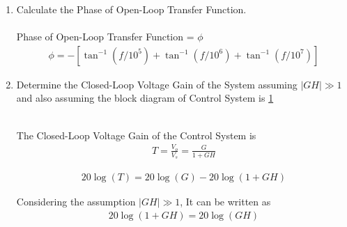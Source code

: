 \begin{enumerate}[label=\thesubsection.\arabic*.,ref=\thesubsection.\theenumi]
\item Calculate the Phase of Open-Loop Transfer Function.\\
\solution\\
Phase of Open-Loop Transfer Function = $\phi$
\begin{align}
\phi=-\left[\tan ^{-1}\left(f / 10^{5}\right)+\tan ^{-1}\left(f / 10^{6}\right)+\tan ^{-1}\left(f / 10^{7}\right)\right]
\end{align}


\item Determine the Closed-Loop Voltage Gain of the System assuming $|GH|\gg1$ and also assuming the block diagram of Control System is \ref{fig:Control}
\begin{figure}[ht!]
	\begin{center}
		\resizebox{\columnwidth/1}{!}{}
	\end{center}
	\caption{}
	\label{fig:Control}
\end{figure}

\solution\\
The Closed-Loop Voltage Gain of the Control System is\\
\begin{align}
T = \frac{V_{o}}{V_{s}} = \frac{G}{1+GH}
\end{align}

\begin{align}
20\log(T) = 20\log(G) - 20\log(1+GH)
\end{align}

Considering the assumption $|GH| \gg 1$, It can be written as
\begin{align}
20\log(1+GH) = 20\log(GH)
\end{align}


\end{enumerate}
